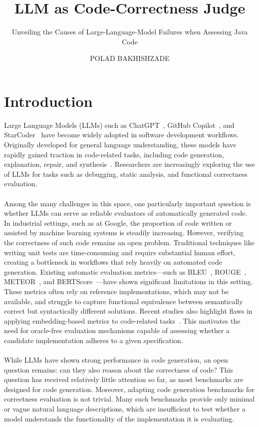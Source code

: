 \documentclass[a4paper]{usiinfbachelorproject}
\author{POLAD BAKHISHZADE}
\title{\textbf{LLM as Code-Correctness Judge}}
\subtitle{Unveiling the Causes of Large-Language-Model Failures when Assessing Java Code}
\begin{document}
\maketitle
\tableofcontents\newpage

\section{Introduction}\label{sec:intro}
Large Language Models (LLMs) such as ChatGPT~\cite{openai2023chatgpt}, GitHub Copilot~\cite{githubcopilot}, and StarCoder~\cite{li2023starcoder} have become widely adopted in software development workflows. Originally developed for general language understanding, these models have rapidly gained traction in code-related tasks, including code generation, explanation, repair, and synthesis~\cite{jiang2024survey, chen2021codex, wang2023codet}. Researchers are increasingly exploring the use of LLMs for tasks such as debugging, static analysis, and functional correctness evaluation.\\
\\[2pt]
Among the many challenges in this space, one particularly important question is whether LLMs can serve as reliable evaluators of automatically generated code. In industrial settings, such as at Google, the proportion of code written or assisted by machine learning systems is steadily increasing. However, verifying the correctness of such code remains an open problem. Traditional techniques like writing unit tests are time-consuming and require substantial human effort, creating a bottleneck in workflows that rely heavily on automated code generation. Existing automatic evaluation metrics—such as BLEU~\cite{papineni2002bleu}, ROUGE~\cite{lin2004rouge}, METEOR~\cite{banerjee2005meteor}, and BERTScore~\cite{zhang2019bertscore}—have shown significant limitations in this setting. These metrics often rely on reference implementations, which may not be available, and struggle to capture functional equivalence between semantically correct but syntactically different solutions. Recent studies also highlight flaws in applying embedding-based metrics to code-related tasks~\cite{naik2024limitations}. This motivates the need for oracle-free evaluation mechanisms capable of assessing whether a candidate implementation adheres to a given specification.\\
\\[2pt]
While LLMs have shown strong performance in code generation, an open question remains: can they also reason about the correctness of code? This question has received relatively little attention so far, as most benchmarks are designed for code generation. Moreover, adapting code generation benchmarks for correctness evaluation is not trivial. Many such benchmarks provide only minimal or vague natural language descriptions, which are insufficient to test whether a model understands the functionality of the implementation it is evaluating.\\
\end{document}
